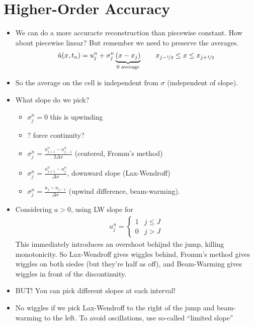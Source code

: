 \documentclass{article}
\newcommand{\half}{\nicefrac{1}{2}}
\newcommand{\Dx}{\Delta x}
\begin{document}
    \section{Higher-Order Accuracy}
        \begin{itemize}
            \item We can do a more accuracte reconstruction than piecewise constant.  How about piecewise linear?  But remember we need to preserve the averages.
            \begin{align*}
                \tilde{u}(x,t_n) = u_j^n + \sigma_j^n\underbrace{\qty(x - x_j)}_{0 \text{ average}} \qquad x_{j-\half} \leq x \leq x_{j+\half}
            \end{align*}
            \item So the average on the cell is independent from $\sigma$ (independent of slope).
            \item What slope do we pick?
            \begin{itemize}
                \item $\sigma_j^n = 0$ this is upwinding
                \item $?$ force continuity?
                \item $\sigma_j^n = \frac{u_{j+1}^n - u_{j-1}^n}{2\Dx}$ (centered, Fromm's method)
                \item $\sigma_j^n = \frac{u_{j+1}^n - u_j^n}{\Dx}$, downward slope (Lax-Wendroff)
                \item $\sigma_j^n = \frac{u_j - u_{j-1}}{\Dx}$ (upwind difference, beam-warming).
            \end{itemize}
            \item Considering $a > 0$, using LW slope for
            \begin{align*}
                u_j^n = \begin{cases}
                    1 & j \leq J \\
                    0 & j > J
                \end{cases}
            \end{align*}
            This immediately introduces an overshoot behijnd the jump, killing monotonicity.  So Lax-Wendroff gives wiggles behind, Fromm's method gives wiggles on both siedes (but they're half as off), and Beam-Warming gives wiggles in front of the discontinuity.
            \item BUT!  You can pick different slopes at each interval!
            \item No wiggles if we pick Lax-Wendroff to the right of the jump and beam-warming to the left.  To avoid oscillations, use so-called ``limited slope''

\end{itemize}
\end{document}
